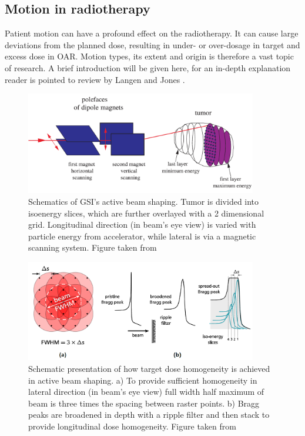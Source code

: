 \documentclass[type=dr, dr=rernat, accentcolor=tud7b,colorbacktitle, bigchapter, openright, twoside, 12pt ]{tudthesis}
\begin{document}
\subsection{Motion in radiotherapy}
\label{sec:motion}

Patient motion can have a profound effect on the radiotherapy. It can cause large deviations from the planned dose, resulting in under- or over-dosage in target and excess dose in OAR. Motion types, its extent and origin is therefore a vast topic of research. 
A brief introduction will be given here, for an in-depth explanation reader is pointed to review by Langen and Jones \cite{Langen2001}.

\newpage

\vspace*{0.6cm}

\begin{figure}[H]
\begin{center}
\includegraphics[width=0.9\textwidth]{./Images/therapy.png}
\caption{Schematics of GSI's active beam shaping. Tumor is divided into isoenergy slices, which are further overlayed with a 2 dimensional grid. 
Longitudinal direction (in beam's eye view) is varied with particle energy from accelerator, while lateral is via a magnetic scanning system. Figure taken from \cite{Kraemer2009}}
\label{scanning}
\end{center}
\end{figure}


\begin{figure}[H]
\begin{center}
\includegraphics[width=0.9\textwidth]{./Images/active.png}
\caption{Schematic presentation of how target dose homogeneity is achieved in active beam shaping. a) To provide sufficient homogeneity in lateral direction (in beam's eye view) full width
half maximum of beam is three times the spacing between raster points. b) Bragg peaks are broadened in depth with a ripple filter and then stack to provide longitudinal dose homogeneity. 
Figure taken from \cite{Richter2012}}
\label{active}
\end{center}
\end{figure}
\end{document}
